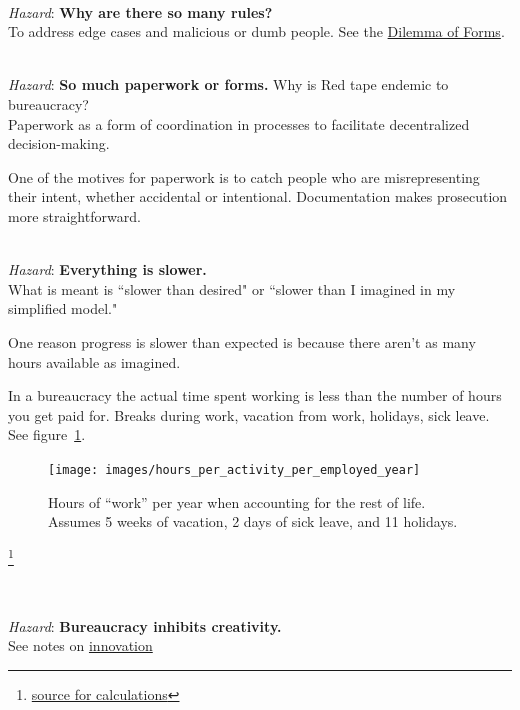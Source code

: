 \ \\
\textit{Hazard}: \textbf{Why are there so many rules?}\\
To address edge cases and malicious or dumb people. See the \hyperref[table:dilemma-subject-forms]{Dilemma of Forms}.

\ \\
\textit{Hazard}: \textbf{So much paperwork or forms.}
Why is Red tape endemic to bureaucracy?\\
Paperwork as a form of coordination in processes to facilitate decentralized decision-making. 

One of the motives for paperwork is to catch people who are misrepresenting their intent, whether accidental or intentional. Documentation makes prosecution more straightforward.

\ \\
\textit{Hazard}: \textbf{Everything is slower.}\\
What is meant is ``slower than desired" or ``slower than I imagined in my simplified model."

One reason progress is slower than expected is because there aren't as many hours available as imagined.



In a bureaucracy the actual time spent working is less than the number of hours you get paid for. Breaks during work, vacation from work, holidays, sick leave. See figure~\ref{fig:hours_per_year}.


\begin{figure}[H]
    \centering
    \texttt{[image: images/hours\_per\_activity\_per\_employed\_year]}
    \caption{Hours of ``work'' per year when accounting for the rest of life. Assumes 5 weeks of vacation, 2 days of sick leave, and 11 holidays.}
    \label{fig:hours_per_year}
\end{figure}


\footnote{\href{https://docs.google.com/spreadsheets/d/1ZaOZZXWkEzX4fFltUdlR4A6ENrAXnkzTW4YrjA4tDO8/edit?usp=sharing}{source for calculations}}

\ \\
\begin{samepage}
\textit{Hazard}: \textbf{Bureaucracy inhibits creativity.}\\
See 
notes on 
\hyperref[sec:innovation]{innovation}\iftoggle{haspagenumbers}{ on page~\pageref{sec:innovation}.}{.}
\end{samepage}

